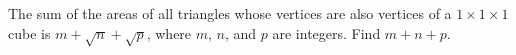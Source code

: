 The sum of the areas of all triangles whose vertices are also vertices of a $1\times 1 \times 1$ cube is $m+\sqrt{n}+\sqrt{p}$, where $m$, $n$, and $p$ are integers.  Find $m+n+p$.